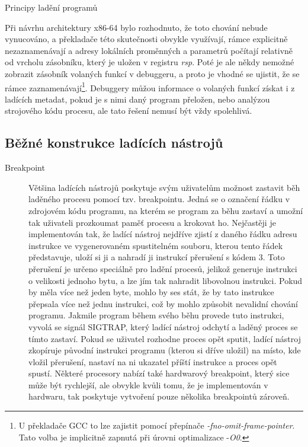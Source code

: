 \documentclass[bc,male,python,dept460]{diploma}						%
\newcommand{\parspace}[1][]{
	\ifthenelse{\isempty{#1}}{\vspace{5mm}}{\vspace{#1}}
	\par
}
\begin{document}
\begin{section}{Principy ladění programů}
		\parspace Při návrhu architektury x86-64 bylo rozhodnuto, že toto chování nebude vynucováno\cite[16]{x64abi}, a překladače této skutečnosti
		obvykle využívají, rámce explicitně nezaznamenávají a adresy lokálních proměnných a parametrů počítají relativně od vrcholu zásobníku,
		který je uložen v registru \textit{rsp}. Poté je ale někdy nemožné zobrazit zásobník volaných funkcí v debuggeru, a proto je vhodné se ujistit,
		že se rámce zaznamenávají\footnote{U překladače GCC to lze zajistit pomocí přepínače \textit{-fno-omit-frame-pointer}.
		Tato volba je implicitně zapnutá při úrovni optimalizace -\textit{O0}. }.
		Debuggery můžou informace o volaných funkcí získat i z ladících metadat, pokud je s nimi daný program přeložen,
		nebo analýzou strojového kódu procesu, ale tato řešení nemusí být vždy spolehlivá.
	
	\subsection{Běžné konstrukce ladících nástrojů}
		\begin{description}
			\item[Breakpoint]
				Většina ladících nástrojů poskytuje svým uživatelům možnost zastavit běh laděného procesu pomocí tzv. breakpointu.
				Jedná se o označení řádku v zdrojovém kódu programu, na kterém se program za běhu zastaví a umožní tak uživateli prozkoumat paměť procesu a krokovat ho.
				Nejčastěji je implementován tak, že ladící nástroj nejdříve zjistí z daného řádku adresu instrukce ve vygenerovaném spustitelném souboru, kterou tento
				řádek představuje, uloží si ji a nahradí ji instrukcí přerušení s kódem 3. Toto přerušení je určeno speciálně pro ladění procesů, jelikož generuje
				instrukci o velikosti jednoho bytu, a lze jím tak nahradit libovolnou instrukci\cite[306]{intel}. Pokud by měla více než jeden byte, mohlo by ses
				stát, že by tato instrukce přepsala více než jednu instrukci, což by mohlo způsobit nevalidní chování programu. Jakmile program během svého běhu
				provede tuto instrukci, vyvolá se signál SIGTRAP, který ladící nástroj odchytí a laděný proces se tímto zastaví. Pokud se uživatel rozhodne proces
				opět sputit, ladící nástroj zkopíruje původní instrukci programu (kterou si dříve uložil) na místo, kde vložil přerušení, nastaví na ni ukazatel
				příští instrukce a proces opět spustí.
				Některé procesory nabízí také hardwarový breakpoint, který sice může být rychlejší, ale obvykle kvůli tomu, že je implementován v hardwaru, tak poskytuje
				vytvoření pouze několika breakpointů zároveň.

\end{description}
\end{section}
\end{document}

